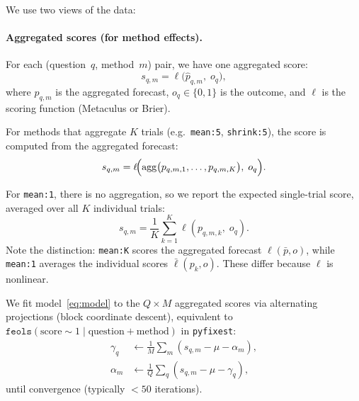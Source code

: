 \documentclass[11pt]{article}
\begin{document}
We use two views of the data:

\paragraph{Aggregated scores (for method effects).}
For each (question~$q$, method~$m$) pair, we have one aggregated score:
\begin{equation}
  s_{q,m} = \ell\!\bigl(\hat{p}_{q,m},\; o_q\bigr),
\end{equation}
where $\hat{p}_{q,m}$ is the aggregated forecast, $o_q \in \{0,1\}$ is the
outcome, and $\ell$ is the scoring function (Metaculus or Brier).

For methods that aggregate $K$ trials (e.g.\ \texttt{mean:5}, \texttt{shrink:5}),
the score is computed from the aggregated forecast:
\begin{equation}
  s_{q,m} = \ell\!\Bigl(\mathrm{agg}\bigl(p_{q,m,1}, \ldots, p_{q,m,K}\bigr),\; o_q\Bigr).
\end{equation}

For \texttt{mean:1}, there is no aggregation, so we report the expected
single-trial score, averaged over all $K$ individual trials:
\begin{equation}
  s_{q,m} = \frac{1}{K} \sum_{k=1}^{K} \ell(p_{q,m,k},\; o_q).
  \label{eq:mean1}
\end{equation}
Note the distinction: \texttt{mean:K} scores the aggregated forecast
$\ell(\bar{p}, o)$, while \texttt{mean:1} averages the individual scores
$\bar{\ell}(p_k, o)$.  These differ because $\ell$ is nonlinear.

We fit model~\eqref{eq:model} to the $Q \times M$ aggregated scores
via alternating projections (block coordinate descent), equivalent to
$\texttt{feols}(\text{score} \sim 1 \mid \text{question} + \text{method})$
in \texttt{pyfixest}:
\begin{align}
  \gamma_q &\leftarrow \frac{1}{M} \sum_m (s_{q,m} - \mu - \alpha_m), \\
  \alpha_m &\leftarrow \frac{1}{Q} \sum_q (s_{q,m} - \mu - \gamma_q),
\end{align}
until convergence (typically $< 50$ iterations).
\end{document}
